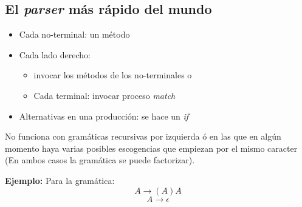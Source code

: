 \documentclass[10pt,letterpaper,twocolumn]{article}
\newcommand{\codigofuente}[1]{

\dotfill
}
\begin{document}
\subsection{El \textit{parser} más rápido del mundo}
\begin{itemize}
\item Cada no-terminal: un método
\item Cada lado derecho:
  \begin{itemize}
  \item invocar los métodos de los no-terminales o
  \item Cada terminal: invocar proceso \textit{match}
  \end{itemize}
\item Alternativas en una producción: se hace un \textit{if}
\end{itemize}
\medskip
No funciona con gramáticas recursivas por izquierda ó en las que en algún momento haya
varias posibles escogencias que empiezan por el mismo caracter (En ambos casos la gramática se puede factorizar).

\medskip
\textbf{Ejemplo:} Para la gramática:
$$
A \longrightarrow (A)A
$$ $$
A \longrightarrow \epsilon
$$

\codigofuente{./src/misc/parser_recursivo_desc.cpp}
\end{document}
